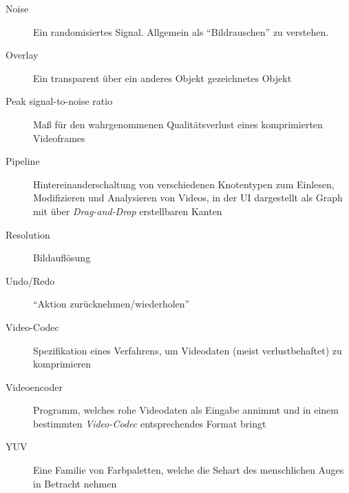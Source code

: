 \begin{description}
    \item[Noise] Ein randomisiertes Signal. Allgemein als ``Bildrauschen'' zu verstehen.
    \item[Overlay] Ein transparent über ein anderes Objekt gezeichnetes Objekt
    \item[Peak signal-to-noise ratio] Maß für den wahrgenommenen Qualitätsverlust eines komprimierten Videoframes
    \item[Pipeline] Hintereinanderschaltung von verschiedenen Knotentypen zum Einlesen, Modifizieren und Analysieren von Videos, in der UI dargestellt als Graph mit über \emph{Drag-and-Drop} erstellbaren Kanten
    \item[Resolution] Bildauflösung
    \item[Undo/Redo] ``Aktion zurücknehmen/wiederholen''
    \item[Video-Codec] Spezifikation eines Verfahrens, um Videodaten (meist verlustbehaftet) zu komprimieren
    \item[Videoencoder] Programm, welches rohe Videodaten als Eingabe annimmt und in einem bestimmten \emph{Video-Codec} entsprechendes Format bringt
    \item[YUV] Eine Familie von Farbpaletten, welche die Sehart des menschlichen Auges in Betracht nehmen
\end{description}
